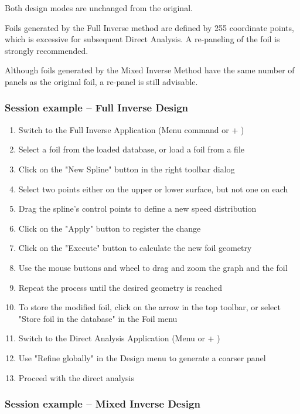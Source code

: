 \documentclass[a4paper,twoside,12pt,dvips]{article}
\begin{document}
Both design modes are unchanged from the original.

Foils generated by the Full Inverse method are defined by 255
coordinate points, which is excessive for subsequent Direct
Analysis. A re-paneling of the foil is strongly recommended.

Although foils generated by the Mixed Inverse Method have the same
number of panels as the original foil, a re-panel is still advisable.

\subsubsection{Session example -- Full Inverse Design}

\begin{enumerate}
\item Switch to the Full Inverse Application (Menu command or \Ctrl +
)
\item Select a foil from the loaded database, or load a foil from a
file
\item Click on the "New Spline" button in the right toolbar dialog
\item Select two points either on the upper or lower surface, but not
one on each
\item Drag the spline's control points to define a new speed
distribution
\item Click on the "Apply" button to register the change
\item Click on the "Execute" button to calculate the new foil
geometry
\item Use the mouse buttons and wheel to drag and zoom the graph and
the foil
\item Repeat the process until the desired geometry is reached
\item To store the modified foil, click on the arrow in the top
toolbar, or select "Store foil in the database" in the Foil menu
\item Switch to the Direct Analysis Application (Menu or \Ctrl +
)
\item Use "Refine globally" in the Design menu to generate a coarser
panel
\item Proceed with the direct analysis
\end{enumerate}

\subsubsection{Session example -- Mixed Inverse Design}
\end{document}
